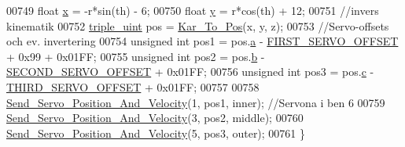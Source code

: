 \begin{DoxyCode}
00749     \textcolor{keywordtype}{float} \hyperlink{sensor_8h_a6c4b361d72eb3767ba424ac9a6ecf52b}{x} = -r*sin(th) - 6;
00750     \textcolor{keywordtype}{float} \hyperlink{sensor_8h_a0ed6a908288e0cd87f79c1b5ab56d07c}{y} = r*cos(th) + 12;
00751     \textcolor{comment}{//invers kinematik }
00752     \hyperlink{structtriple__uint}{triple\_uint} pos = \hyperlink{invers__kinematik_8c_a68f82386196ad991ed54fb9796d90f7c}{Kar\_To\_Pos}(x, y, z);
00753     \textcolor{comment}{//Servo-offsets och ev. invertering }
00754     \textcolor{keywordtype}{unsigned} \textcolor{keywordtype}{int} pos1 = pos.\hyperlink{structtriple__uint_a0ea8a85723620c90be9fd2a693f12a59}{a} - \hyperlink{servo___u_a_r_t_8c_a4c437d01d2f060ec86c16ed5e76efe45}{FIRST\_SERVO\_OFFSET} + 0x99 + 0x01FF;
00755     \textcolor{keywordtype}{unsigned} \textcolor{keywordtype}{int} pos2 = pos.\hyperlink{structtriple__uint_a790d5baa17ec7aaf7bb49750a16e9c29}{b} - \hyperlink{servo___u_a_r_t_8c_acb02dedbe5ff19694bdb5b2ddf61664a}{SECOND\_SERVO\_OFFSET} + 0x01FF;
00756     \textcolor{keywordtype}{unsigned} \textcolor{keywordtype}{int} pos3 = pos.\hyperlink{structtriple__uint_a6ce17b018c47d0f1d0e53a458f741ad3}{c} - \hyperlink{servo___u_a_r_t_8c_ac2f065c44b617c91ea7f4237e8ead729}{THIRD\_SERVO\_OFFSET} + 0x01FF;
00757     
00758     \hyperlink{servo___u_a_r_t_8c_aef28545296037ecc0350638a407a680f}{Send\_Servo\_Position\_And\_Velocity}(1, pos1, inner); \textcolor{comment}{//Servona i ben 6}
00759     \hyperlink{servo___u_a_r_t_8c_aef28545296037ecc0350638a407a680f}{Send\_Servo\_Position\_And\_Velocity}(3, pos2, middle);
00760     \hyperlink{servo___u_a_r_t_8c_aef28545296037ecc0350638a407a680f}{Send\_Servo\_Position\_And\_Velocity}(5, pos3, outer);
00761 \}
\end{DoxyCode}
